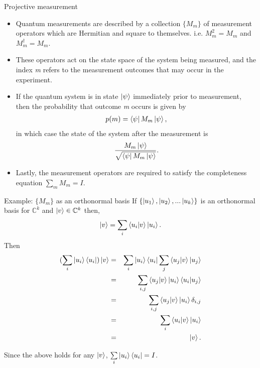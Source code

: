 \documentclass[handout, 10 pt]{beamer}
\begin{document}
\begin{frame}{Projective measurement}
\begin{itemize}
    \item Quantum measurements are described by a collection $\{M_m\}$ of measurement operators which are Hermitian and square to themselves. i.e. $M_m^2=M_m$ and $M_m^\dagger=M_m$.
    \pause
    \item These operators act on the state space of the system being measured, and the index {\emph{m}} refers to the measurement outcomes that may occur in the experiment. 
    \pause
    \item If the quantum system is in state $\ket{\psi}$ immediately prior to measurement, then the probability that outcome {\emph{m}} occurs is given by 
    \begin{gather*}
       p(m)=\bra{\psi}M_m \ket{\psi},
    \end{gather*}
    in which case the state of the system after the measurement is
    \begin{gather*}
        \frac{M_m \ket{\psi}}{\sqrt{\bra{\psi}M_m \ket{\psi}}}.
    \end{gather*}
    \pause
    \item Lastly, the measurement operators are required to satisfy the completeness equation $\sum\limits_m M_m =I$.   
\end{itemize}
\end{frame}



\begin{frame}{Example: $\{M_m\}$ as an orthonormal basis }
 If $\{\ket{u_1}, \ket{u_2}, ...\ket{u_k}\}$ is an orthonormal basis for ${\mathbb{C}}^k$ and $\ket{v} \in {\mathbb{C}}^k$ then, 
$$\ket{v}=\sum\limits_i\braket{u_i|v}\ket{u_i} .$$
Then
\begin{eqnarray*}
    (\sum_i \ket{u_i}\bra{u_i})\ket{v}&=&
    \sum_i \ket{u_i}\bra{u_i}\sum_j \braket{u_j|v} \ket{u_j}\\
    &=& \sum_{i,j}\braket{u_j|v}\ket{u_i}\braket{u_i|u_j}\\
    &=& \sum_{i,j}\braket{u_j|v}\ket{u_i}\delta_{i,j}\\
    &=&\sum_i \braket{u_i|v}\ket{u_i}\\
    &=&\ket{v}.
\end{eqnarray*}

Since the above holds for any $\ket{v}$, $\sum\limits_i \ket{u_i}\bra{u_i}=I$.   
\end{frame}
\end{document}
